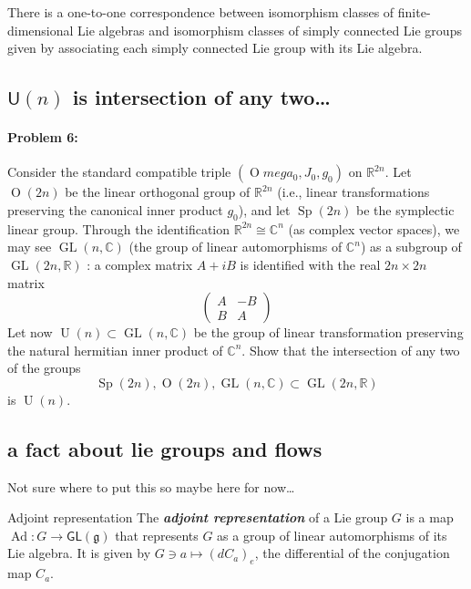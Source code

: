 \begin{thm}
	There is a one-to-one correspondence between isomorphism classes of finite-dimensional Lie algebras and isomorphism classes of simply connected Lie groups given by associating each simply connected Lie group with its Lie algebra.
\end{thm}


\subsection{\(\mathsf{U}(n)\) is intersection of any two…}

 \paragraph{Problem 6:} Consider the standard compatible triple $(\operatorname{O}mega_0,J_0,g_0)$ on $\mathbb{R}^{2n}$. Let $\operatorname{O}(2n)$ be the linear orthogonal group of $\mathbb{R}^{2n}$ (i.e., linear transformations preserving the canonical inner product $g_0$), and let $\operatorname{Sp}(2n)$ be the symplectic linear group. Through the identification $\mathbb{R}^{2n}\cong \mathbb{C}^{n}$ (as complex vector spaces), we may see $\operatorname{GL}(n,\mathbb{C})$ (the group of linear automorphisms of $\mathbb{C}^{n}$) as a subgroup of $\operatorname{GL}(2n,\mathbb{R})$ : a complex matrix $A+iB$ is identified with the real $2n\times 2n$ matrix
 \[\begin{pmatrix}A&-B\\B&A\end{pmatrix}\]
Let now $\operatorname{U}(n)\subset\operatorname{GL}(n,\mathbb{C})$ be the group of linear transformation preserving the natural hermitian inner product of $\mathbb{C}^{n}$. Show that the intersection of any two of the groups
\[\operatorname{Sp}(2n),\operatorname{O}(2n),\operatorname{GL}(n,\mathbb{C})\subset\operatorname{GL}(2n,\mathbb{R})\]
is $\operatorname{U}(n)$.

\subsection{a fact about lie groups and flows}

Not sure where to put this so maybe here for now…

\begin{thing7}{Adjoint representation}\leavevmode
The \textit{\textbf{adjoint representation}} of a Lie group \(G\) is a map \(\operatorname{Ad}:G \to \mathsf{GL}(\mathfrak{g})\) that represents \(G\) as a group of linear automorphisms of its Lie algebra. It is given by \(G \ni a \mapsto (dC_a)_e\), the differential of the conjugation map \(C_a\).
\end{thing7}

